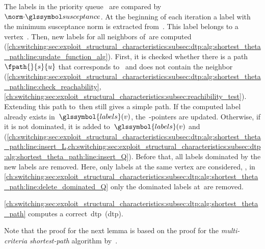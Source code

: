 %
The labels in the priority queue~ are compared
by~$\bnorm{\cdot}$.
% 
% 
At the beginning of each iteration a label with the minimum susceptance norm is
extracted from~. This label belongs to a
vertex~\vertexa. Then, new labels for all neighbors of~\vertexa are computed
(\cref{ch:switching:sec:exploit_structural_characteristics:subsec:dtp:alg:shortest_theta_path:line:update_function_alg}). First, it is checked
whether there is a path~$\fpath{}{\source}{\vertexa}$ that corresponds to~
 and does not contain the neighbor~\vertexb
(\cref{ch:switching:sec:exploit_structural_characteristics:subsec:dtp:alg:shortest_theta_path:line:check_reachability},
\cref{ch:switching:sec:exploit_structural_characteristics:subsec:reachibility_test}). Extending this path to~\vertexb then
still gives a simple path. If the computed label already exists
in~$\glssymbol{labels}(\vertexb)$, the~\parent-pointers are updated. Otherwise,
if it is not dominated, it is added to~$\glssymbol{labels}(\vertexb)$
and~
(\cref{ch:switching:sec:exploit_structural_characteristics:subsec:dtp:alg:shortest_theta_path:line:insert_L,ch:switching:sec:exploit_structural_characteristics:subsec:dtp:alg:shortest_theta_path:line:insert_Q}).
Before that, all labels dominated by the new labels are removed. Here, only
labels at the same vertex are considered, \ie, in
\cref{ch:switching:sec:exploit_structural_characteristics:subsec:dtp:alg:shortest_theta_path:line:delete_dominated_Q} only the dominated labels
at~\vertexb are removed.
%
\begin{lemma}%
\cref{ch:switching:sec:exploit_structural_characteristics:subsec:dtp:alg:shortest_theta_path} computes a correct~\acrlong{dtp}~(\gls{dtp}).
\label{lem:correctDTP}
\end{lemma}%
% 
Note that the proof for the next lemma is based on the proof for the 
\emph{multi-criteria shortest-path} algorithm by~\textcite{MARTINS1984236}.
% 

